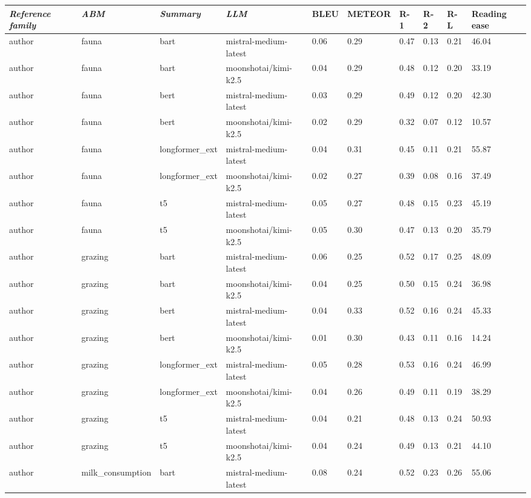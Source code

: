 \begin{tabular}{|l|l|l|l|l|l|l|l|l|l|}
\hline
\textit{\textbf{Reference family}} & \textit{\textbf{ABM}} & \textit{\textbf{Summary}} & \textit{\textbf{LLM}} & BLEU & METEOR & R-1 & R-2 & R-L & Reading ease \\
 \hline
 author & fauna & bart & mistral-medium-latest & 0.06 & 0.29 & 0.47 & 0.13 & 0.21 & 46.04 \\
 \hline
 author & fauna & bart & moonshotai/kimi-k2.5 & 0.04 & 0.29 & 0.48 & 0.12 & 0.20 & 33.19 \\
 \hline
 author & fauna & bert & mistral-medium-latest & 0.03 & 0.29 & 0.49 & 0.12 & 0.20 & 42.30 \\
 \hline
 author & fauna & bert & moonshotai/kimi-k2.5 & 0.02 & 0.29 & 0.32 & 0.07 & 0.12 & 10.57 \\
 \hline
 author & fauna & longformer\_ext & mistral-medium-latest & 0.04 & 0.31 & 0.45 & 0.11 & 0.21 & 55.87 \\
 \hline
 author & fauna & longformer\_ext & moonshotai/kimi-k2.5 & 0.02 & 0.27 & 0.39 & 0.08 & 0.16 & 37.49 \\
 \hline
 author & fauna & t5 & mistral-medium-latest & 0.05 & 0.27 & 0.48 & 0.15 & 0.23 & 45.19 \\
 \hline
 author & fauna & t5 & moonshotai/kimi-k2.5 & 0.05 & 0.30 & 0.47 & 0.13 & 0.20 & 35.79 \\
 \hline
 author & grazing & bart & mistral-medium-latest & 0.06 & 0.25 & 0.52 & 0.17 & 0.25 & 48.09 \\
 \hline
 author & grazing & bart & moonshotai/kimi-k2.5 & 0.04 & 0.25 & 0.50 & 0.15 & 0.24 & 36.98 \\
 \hline
 author & grazing & bert & mistral-medium-latest & 0.04 & 0.33 & 0.52 & 0.16 & 0.24 & 45.33 \\
 \hline
 author & grazing & bert & moonshotai/kimi-k2.5 & 0.01 & 0.30 & 0.43 & 0.11 & 0.16 & 14.24 \\
 \hline
 author & grazing & longformer\_ext & mistral-medium-latest & 0.05 & 0.28 & 0.53 & 0.16 & 0.24 & 46.99 \\
 \hline
 author & grazing & longformer\_ext & moonshotai/kimi-k2.5 & 0.04 & 0.26 & 0.49 & 0.11 & 0.19 & 38.29 \\
 \hline
 author & grazing & t5 & mistral-medium-latest & 0.04 & 0.21 & 0.48 & 0.13 & 0.24 & 50.93 \\
 \hline
 author & grazing & t5 & moonshotai/kimi-k2.5 & 0.04 & 0.24 & 0.49 & 0.13 & 0.21 & 44.10 \\
 \hline
 author & milk\_consumption & bart & mistral-medium-latest & 0.08 & 0.24 & 0.52 & 0.23 & 0.26 & 55.06 \\

\end{tabular}
